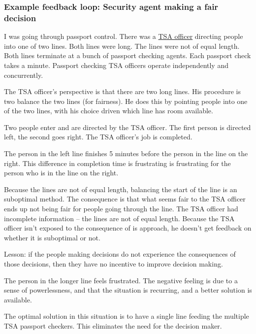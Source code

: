 \subsubsection{Example feedback loop: Security agent making a fair decision}
\begin{mdframed}
I was going through passport control. 
There was a \href{https://en.wikipedia.org/wiki/Transportation_Security_Administration}{TSA officer} directing people into one of two lines. Both lines were long. The lines were not of equal length. Both lines terminate at a bunch of passport checking agents. Each passport check takes a minute. Passport checking TSA officers operate independently and concurrently.


The TSA officer's perspective is that there are two long lines. His procedure is two balance the two lines (for fairness). He does this by pointing people into one of the two lines, with his choice driven which line has room available.

Two people enter and are directed by the TSA officer. The first person is directed left, the second goes right. The TSA officer's job is completed.

The person in the left line finishes 5 minutes before the person in the line on the right. This difference in completion time is frustrating is frustrating for the person who is in the line on the right.

Because the lines are not of equal length, balancing the start of the line is an suboptimal method. The consequence is that what seems fair to the TSA officer ends up not being fair for people going through the line. The TSA officer had incomplete information -- the lines are not of equal length. Because the TSA officer isn't exposed to the consequence of is approach, he doesn't get feedback on whether it is suboptimal or not.
\end{mdframed}

Lesson: if the people making decisions do not experience the consequences of those decisions, then they have no incentive to improve decision making.

The person in the longer line feels frustrated. The negative feeling is due to a sense of powerlessness, and that the situation is recurring, and a better solution is available.

The optimal solution in this situation is to have a single line feeding the multiple TSA passport checkers. This eliminates the need for the decision maker.


